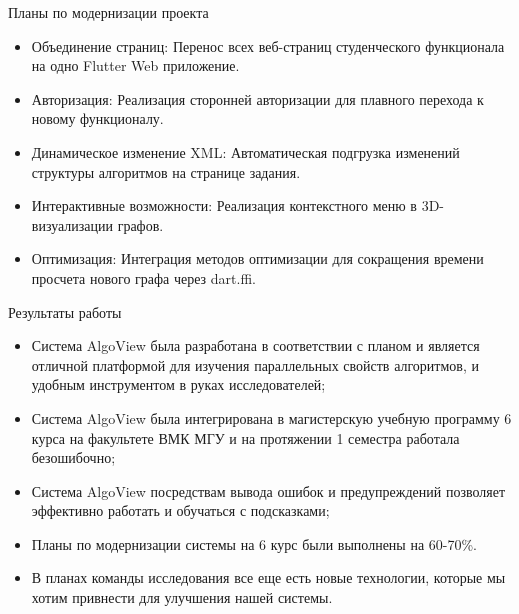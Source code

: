 \begin{frame}{Планы по модернизации проекта}
\begin{itemize}
    \item Объединение страниц: Перенос всех веб-страниц студенческого функционала на одно Flutter Web приложение.

    \item Авторизация: Реализация сторонней авторизации для плавного перехода к новому функционалу.

    \item Динамическое изменение XML: Автоматическая подгрузка изменений структуры алгоритмов на странице задания.

    \item Интерактивные возможности: Реализация контекстного меню в 3D-визуализации графов.

    \item Оптимизация: Интеграция методов оптимизации для сокращения времени просчета нового графа через dart.ffi.
    
\end{itemize}
\end{frame}



 





\begin{frame}{Результаты работы}

\begin{itemize}
    \item Система AlgoView была разработана в соответствии с планом и является отличной платформой для изучения параллельных свойств алгоритмов, и удобным инструментом в руках исследователей;
    \item Система AlgoView была интегрирована в магистерскую учебную программу 6 курса на  факультете ВМК МГУ и на протяжении 1 семестра работала безошибочно;
    \item Система AlgoView посредствам вывода ошибок и предупреждений позволяет эффективно работать и обучаться с подсказками;
    \item Планы по модернизации системы на 6 курс были выполнены на 60-70\%.
    \item В планах команды исследования все еще есть новые технологии, которые мы хотим привнести для улучшения нашей системы.
    
\end{itemize}

\end{frame}
